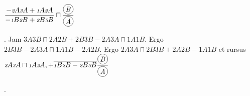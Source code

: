 $\displaystyle\frac{-{\scriptstyle \textit{2}}A{\scriptstyle \textit{3}}A+{\scriptstyle \textit{1}}A{\scriptstyle \textit{2}}A}{-{\scriptstyle \textit{1}}B{\scriptstyle \textit{2}}B+{\scriptstyle \textit{2}}B{\scriptstyle \textit{3}}B} \sqcap \displaystyle\frac{\raisebox{-1.0ex}{\begin{tikzpicture}\draw (0,0) circle (0.25cm) node {\textit{B}};\end{tikzpicture}}}{\raisebox{-1.0ex}{\begin{tikzpicture}\draw (0,0) circle (0.25cm) node {\textit{A}};\end{tikzpicture}}}$\rule[0mm]{0mm}{06mm}. Jam ${\scriptstyle \textit{3}}A{\scriptstyle \textit{3}}B \sqcap {\scriptstyle \textit{2}}A{\scriptstyle \textit{2}}B + {\scriptstyle \textit{2}}B{\scriptstyle \textit{3}}B - {\scriptstyle \textit{2}}A{\scriptstyle \textit{3}}A \sqcap {\scriptstyle \textit{1}}A{\scriptstyle \textit{1}}B$. Ergo ${\scriptstyle \textit{2}}B{\scriptstyle \textit{3}}B-{\scriptstyle \textit{2}}A{\scriptstyle \textit{3}}A \sqcap {\scriptstyle \textit{1}}A{\scriptstyle \textit{1}}B-{\scriptstyle \textit{2}}A{\scriptstyle \textit{2}}B.$ Ergo ${\scriptstyle \textit{2}}A{\scriptstyle \textit{3}}A \sqcap {\scriptstyle \textit{2}}B{\scriptstyle \textit{3}}B +{\scriptstyle \textit{2}}A{\scriptstyle \textit{2}}B -{\scriptstyle \textit{1}}A{\scriptstyle \textit{1}}B$ et rursus ${\scriptstyle \textit{2}}A{\scriptstyle \textit{3}}A \sqcap {\scriptstyle \textit{1}}A{\scriptstyle \textit{2}}A, +\overline{{\scriptstyle \textit{1}}B{\scriptstyle \textit{2}}B-{\scriptstyle \textit{2}}B{\scriptstyle \textit{3}}B}  \displaystyle\frac{\raisebox{-1.0ex}{\begin{tikzpicture}\draw (0,0) circle (0.25cm) node {\textit{B}};\end{tikzpicture}}}{\raisebox{-1.0ex}{\begin{tikzpicture}\draw (0,0) circle (0.25cm) node {\textit{A}};\end{tikzpicture}}}$\rule[-4mm]{0mm}{06mm}. 
%
